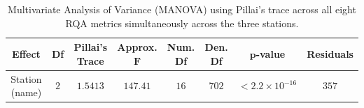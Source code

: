 \vspace{-3pt}
\begin{table}[H]
\caption{Multivariate Analysis of Variance (MANOVA) using Pillai's trace across all eight RQA metrics simultaneously across the three stations.\label{tab:manova_fit}}
\begin{tabularx}{\textwidth}{CCCCCCCC}
\toprule
\textbf{Effect} & \textbf{Df} & \textbf{Pillai's Trace} & \textbf{Approx.} $\boldsymbol{F}$ & \textbf{Num. Df} & \textbf{Den. Df} & $\boldsymbol{p}$\textbf{-value} & \textbf{Residuals} \\
\midrule
Station (name) & $2$ & $1.5413$ & $147.41$ & $16$ & $702$ & $< 2.2 \times 10^{-16}$ & $357$ \\
\bottomrule
\end{tabularx}
\end{table}
\vspace{-3pt}
